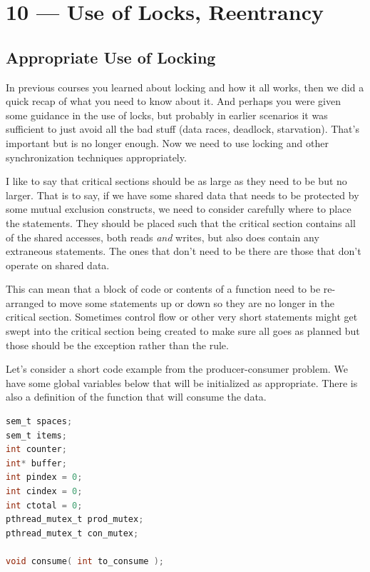 \documentclass[a4paper]{report}
\begin{document}
\chapter*{10 --- Use of Locks, Reentrancy}


\section*{Appropriate Use of Locking}

In previous courses you learned about locking and how it all works, then we did a quick recap of what you need to know about it. And perhaps you were given some guidance in the use of locks, but probably in earlier scenarios it was sufficient to just avoid all the bad stuff (data races, deadlock, starvation). That's important but is no longer enough. Now we need to use locking and other synchronization techniques appropriately. 

I like to say that critical sections should be as large as they need to be but no larger. That is to say, if we have some shared data that needs to be protected by some mutual exclusion constructs, we need to consider carefully where to place the statements. They should be placed such that the critical section contains all of the shared accesses, both reads \textit{and} writes, but also does contain any extraneous statements. The ones that don't need to be there are those that don't operate on shared data. 

This can mean that a block of code or contents of a function need to be re-arranged to move some statements up or down so they are no longer in the critical section. Sometimes control flow or other very short statements might get swept into the critical section being created to make sure all goes as planned but those should be the exception rather than the rule.

Let's consider a short code example from the producer-consumer problem. We have some global variables below that will be initialized as appropriate. There is also a definition of the function that will consume the data.

\begin{lstlisting}[language=C]
sem_t spaces;
sem_t items;
int counter;
int* buffer;
int pindex = 0;
int cindex = 0;
int ctotal = 0;
pthread_mutex_t prod_mutex;
pthread_mutex_t con_mutex;

void consume( int to_consume );

\end{lstlisting}
\end{document}
